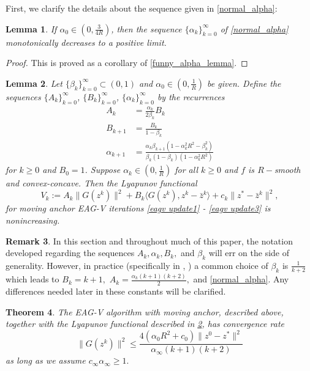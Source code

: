 \documentclass[11pt,reqno,oneside]{amsart}
\newtheorem{theorem}{Theorem}[section]
\newtheorem{lemma}[theorem]{Lemma}
\theoremstyle{definition}
\newtheorem{remark}[theorem]{Remark}
\numberwithin{equation}{section}
\begin{document}
First, we clarify the details about the sequence given in \eqref{normal_alpha}:
\begin{lemma}\label{normal_alpha_lemma}
    If $\alpha_{0} \in (0, \frac{3}{4R})$, then the sequence $\{\alpha_{k}\}_{k=0}^{\infty}$ of \eqref{normal_alpha} monotonically decreases to a positive limit.
\end{lemma}
\begin{proof}
    This is proved as a corollary of \cref{funny_alpha_lemma}.
\end{proof}

\begin{lemma}\label{LpnvLm_1}
    Let $\{\beta_{k}\}_{k=0}^{\infty} \subset (0,1)$ and $\alpha_{0} \in (0,\frac{1}{R})$ be given.
    Define the sequences $\{A_{k}\}_{k=0}^{\infty}$, $\{B_{k}\}_{k=0}^{\infty}$, $\{\alpha_{k}\}_{k=0}^{\infty}$ by the recurrences
    \begin{align}
        A_{k} & = \frac{\alpha_{k}}{2\beta_{k}}B_{k} \label{ordinary_A} \\
        B_{k+1} & = \frac{B_{k}}{1-\beta_{k}} \label{ordinary_B} \\
        \alpha_{k+1} & = \frac{\alpha_{k}\beta_{k+1}(1 - \alpha_{k}^{2}R^{2} - \beta_{k}^{2})}{\beta_{k}(1-\beta_{k})(1-\alpha_{k}^{2}R^{2})} \label{ordinary_alpha}
    \end{align}
    for $k\geq 0$ and $B_{0} = 1$.
    Suppose $\alpha_{k} \in (0,\frac{1}{R})$ for all $k\geq 0$ and $f$ is $R-$smooth and convex-concave.
    Then the Lyapunov functional
    \[
        V_{k} := A_{k}\|G(z^{k})\|^{2} + B_{k}\langle G(z^{k}),z^{k} - \bar{z}^{k}\rangle +  c_{k}\|z^{*} - \bar{z}^{k}\|^{2},
    \]
    for moving anchor EAG-V iterations \eqref{eagv update1} - \eqref{eagv update3} is nonincreasing.
\end{lemma}

\begin{remark} \label{Lpnv_RMK}
    In this section and throughout much of this paper, the notation developed regarding the sequences $A_{k}, \alpha_{k}, B_{k},$ and $\beta_{k}$ will err on the side of generality.
    However, in practice (specifically in \cite{yoon_ryu}, \cite{alcala2023moving}) a common choice of $\beta_{k}$ is $\frac{1}{k+2}$ which leads to $B_{k} = k+1,$ $A_{k} = \frac{\alpha_{k}(k+1)(k+2)}{2},$ and \eqref{normal_alpha}. Any differences needed later in these constants will be clarified.
\end{remark}

\begin{theorem} \label{conv_conc_convergence_thm}
    The EAG-V algorithm with moving anchor, described above, together with the Lyapunov functional described in \cref{LpnvLm_1}, has convergence rate
    \[
        \|G(z^{k})\|^{2}\leq \frac{4(\alpha_{0}R^{2} + c_{0})\|z^{0}-z^{*}\|^{2}}{\alpha_{\infty}(k+1)(k+2)}
    \]
    as long as we assume $c_{\infty}\alpha_{\infty} \geq 1.$
\end{theorem}
\end{document}
